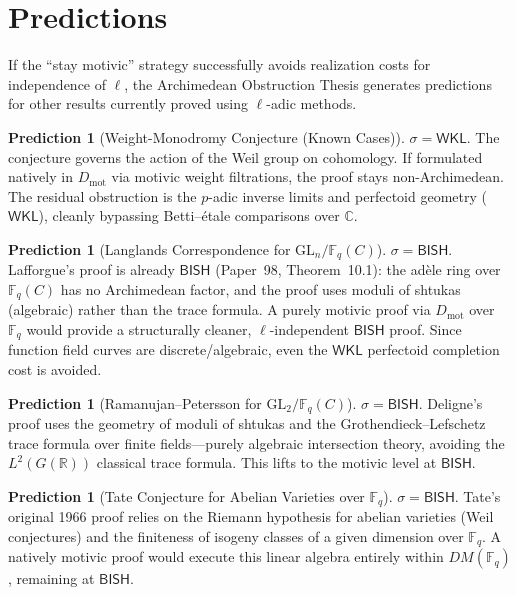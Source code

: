 \documentclass[11pt,a4paper]{article}
\theoremstyle{plain}
\theoremstyle{definition}
\newtheorem{prediction}[theorem]{Prediction}
\newcommand{\BISH}{\textsf{BISH}}
\newcommand{\WKL}{\textsf{WKL}}
\newcommand{\Dmot}{D_{\mathrm{mot}}}
\newcommand{\GL}{\mathrm{GL}}
\newcommand{\R}{\mathbb{R}}
\newcommand{\C}{\mathbb{C}}
\newcommand{\F}{\mathbb{F}}
\newcommand{\sig}{\sigma}
\begin{document}
\section{Predictions}\label{sec:predictions}

If the ``stay motivic'' strategy successfully avoids realization costs for independence of $\ell$, the Archimedean Obstruction Thesis generates predictions for other results currently proved using $\ell$-adic methods.

\begin{prediction}[Weight-Monodromy Conjecture (Known Cases)]
$\sig = \WKL$. The conjecture governs the action of the Weil group on cohomology. If formulated natively in $\Dmot$ via motivic weight filtrations, the proof stays non-Archimedean. The residual obstruction is the $p$-adic inverse limits and perfectoid geometry ($\WKL$), cleanly bypassing Betti--\'etale comparisons over $\C$.
\end{prediction}

\begin{prediction}[Langlands Correspondence for $\GL_n/\F_q(C)$]
$\sig = \BISH$. Lafforgue's proof is already $\BISH$ (Paper~98, Theorem~10.1): the ad\`ele ring over $\F_q(C)$ has no Archimedean factor, and the proof uses moduli of shtukas (algebraic) rather than the trace formula. A purely motivic proof via $\Dmot$ over $\F_q$ would provide a structurally cleaner, $\ell$-independent $\BISH$ proof. Since function field curves are discrete/algebraic, even the $\WKL$ perfectoid completion cost is avoided.
\end{prediction}

\begin{prediction}[Ramanujan--Petersson for $\GL_2/\F_q(C)$]
$\sig = \BISH$. Deligne's proof uses the geometry of moduli of shtukas and the Grothendieck--Lefschetz trace formula over finite fields---purely algebraic intersection theory, avoiding the $L^2(G(\R))$ classical trace formula. This lifts to the motivic level at $\BISH$.
\end{prediction}

\begin{prediction}[Tate Conjecture for Abelian Varieties over $\F_q$]
$\sig = \BISH$. Tate's original 1966 proof relies on the Riemann hypothesis for abelian varieties (Weil conjectures) and the finiteness of isogeny classes of a given dimension over $\F_q$. A natively motivic proof would execute this linear algebra entirely within $DM(\F_q)$, remaining at $\BISH$.
\end{prediction}
\end{document}
